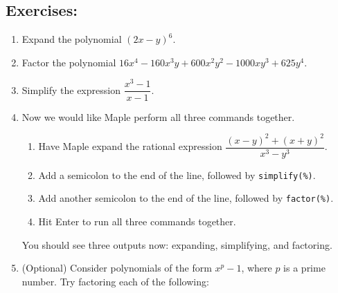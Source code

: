\subsection*{Exercises:}
\begin{enumerate}
    \item Expand the polynomial $(2x-y)^6$.
    \item Factor the polynomial $16x^4-160x^3y+600x^2y^2-1000xy^3+625y^4$.
    \item Simplify the expression $\dfrac{x^3-1}{x-1}$.
    \item Now we would like Maple perform all three commands together.
    \begin{enumerate}
    	\item Have Maple expand the rational expression $\dfrac{(x-y)^2+(x+y)^2}{x^3-y^3}$.
    	\item Add a semicolon to the end of the line, followed by \texttt{simplify(\%)}.
    	\item Add another semicolon to the end of the line, followed by \texttt{factor(\%)}.
    	\item Hit Enter to run all three commands together.
    \end{enumerate}
    You should see three outputs now: expanding, simplifying, and factoring.
    \item (Optional) Consider polynomials of the form $x^p-1$, where $p$ is a prime number. Try factoring each of the following:

\end{enumerate}
